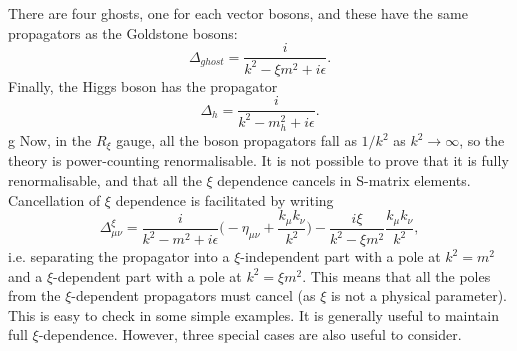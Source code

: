 There are four ghosts, one for each vector bosons, and these have the same propagators as the Goldstone bosons:
\begin{equation}
\Delta_{ghost} = \frac{i}{k^2 - \xi m^2 + i\epsilon}.
\end{equation}
Finally, the Higgs boson has the propagator
\begin{equation}
\Delta_{h} = \frac{i}{k^2 -  m_h^2 + i\epsilon}.
\end{equation} g
Now, in the $R_\xi$ gauge, all the boson propagators fall as $1/k^2$ as $k^2 \to \infty$, so the theory is power-counting renormalisable. It is not possible to prove that it is fully renormalisable, and that all the $\xi$ dependence cancels in S-matrix elements. Cancellation of $\xi$ dependence is facilitated by writing
\begin{equation}
\Delta_{\mu \nu}^\xi = \frac{i}{k^2 - m^2 + i\epsilon}\bigg(-\eta_{\mu \nu} + \frac{k_\mu k_\nu}{k^2} \bigg) - \frac{i\xi}{k^2 - \xi m^2}\frac{k_\mu k_\nu}{k^2},
\end{equation}
i.e. separating the propagator into a $\xi$-independent part with a pole at $k^2 = m^2$ and a $\xi$-dependent part with a pole at $k^2 = \xi m^2$. This means that all the poles from the $\xi$-dependent propagators must cancel (as $\xi$ is not a physical parameter). This is easy to check in some simple examples. It is generally useful to maintain full $\xi$-dependence. However, three special cases are also useful to consider.
